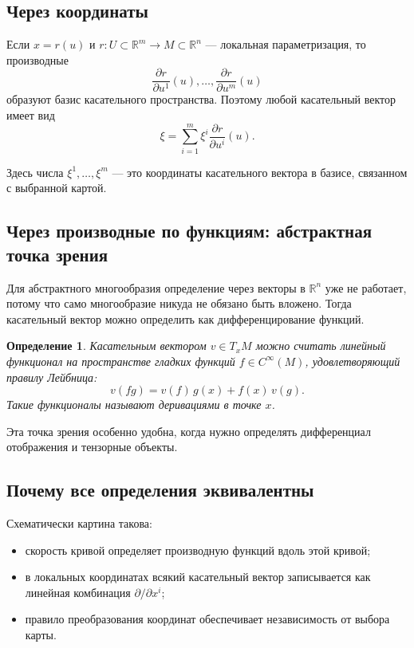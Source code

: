 \documentclass[12pt,a4paper]{article}
\theoremstyle{rudef}
\newtheorem{definition}{Определение}[section]
\theoremstyle{ruplain}
\newcommand{\R}{\mathbb{R}}
\begin{document}
\subsection{Через координаты}

Если $x=r(u)$ и $r:U\subset \R^m\to M\subset \R^n$ --- локальная параметризация, то производные
\[
\frac{\partial r}{\partial u^1}(u),\dots,\frac{\partial r}{\partial u^m}(u)
\]
образуют базис касательного пространства. Поэтому любой касательный вектор имеет вид
\[
\xi=\sum_{i=1}^m \xi^i\frac{\partial r}{\partial u^i}(u).
\]

Здесь числа $\xi^1,\dots,\xi^m$ --- это координаты касательного вектора в базисе, связанном с выбранной картой.

\subsection{Через производные по функциям: абстрактная точка зрения}

Для абстрактного многообразия определение через векторы в $\R^n$ уже не работает, потому что само многообразие никуда не обязано быть вложено. Тогда касательный вектор можно определить как дифференцирование функций.

\begin{definition}
Касательным вектором $v\in T_xM$ можно считать линейный функционал на пространстве гладких функций $f\in C^{\infty}(M)$, удовлетворяющий правилу Лейбница:
\[
v(fg)=v(f)\,g(x)+f(x)\,v(g).
\]
Такие функционалы называют \emph{деривациями} в точке $x$.
\end{definition}

Эта точка зрения особенно удобна, когда нужно определять дифференциал отображения и тензорные объекты.

\subsection{Почему все определения эквивалентны}

Схематически картина такова:
\begin{itemize}
  \item скорость кривой определяет производную функций вдоль этой кривой;
  \item в локальных координатах всякий касательный вектор записывается как линейная комбинация $\partial/\partial x^i$;
  \item правило преобразования координат обеспечивает независимость от выбора карты.
\end{itemize}
\end{document}
